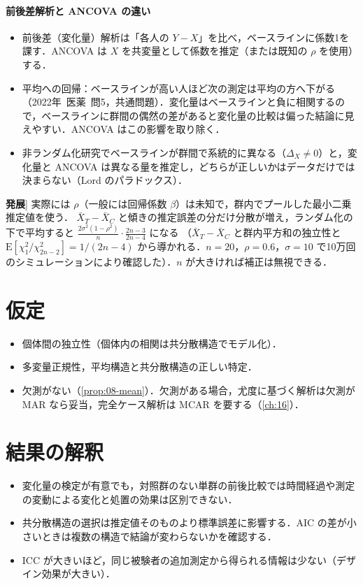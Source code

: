 \documentclass[a4paper,11pt,openany]{ltjsbook}
\newcommand{\tagbox}[2]{\tcbox[on line,boxsep=0.5pt,left=2pt,right=2pt,top=0.5pt,bottom=0.5pt,
  colframe=#1,colback=#1!10,boxrule=0.4pt,arc=1pt]{\scriptsize\bfseries\textcolor{#1}{#2}}}
\newcommand{\Hatten}{\tagbox{bkgray}{発展}}
\newcommand{\kakomon}[2]{\mbox{#1年 医薬 問#2}}
\newcommand{\E}{\mathrm{E}}
\begin{document}
\paragraph{前後差解析と ANCOVA の違い}
\begin{itemize}
\item 前後差（変化量）解析は「各人の $Y-X$」を比べ，ベースラインに係数1を課す．ANCOVA は $X$ を共変量として係数を推定（または既知の $\rho$ を使用）する．
\item 平均への回帰：ベースラインが高い人ほど次の測定は平均の方へ下がる（\kakomon{2022}{5}，共通問題）．変化量はベースラインと負に相関するので，ベースラインに群間の偶然の差があると変化量の比較は偏った結論に見えやすい．ANCOVA はこの影響を取り除く．
\item 非ランダム化研究でベースラインが群間で系統的に異なる（$\Delta_X\ne0$）と，変化量と ANCOVA は異なる量を推定し，どちらが正しいかはデータだけでは決まらない（Lord のパラドックス）．
\end{itemize}

\begin{supbox}[補足：傾きを推定する場合\quad\Hatten]
実際には $\rho$（一般には回帰係数 $\beta$）は未知で，群内でプールした最小二乗推定値を使う．
$\bar X_T-\bar X_C$ と傾きの推定誤差の分だけ分散が増え，ランダム化の下で平均すると $\frac{2\sigma^2(1-\rho^2)}{n}\cdot\frac{2n-3}{2n-4}$ になる
（$\bar X_T-\bar X_C$ と群内平方和の独立性と $\E[\chi^2_1/\chi^2_{2n-2}]=1/(2n-4)$ から導かれる．$n=20$，$\rho=0.6$，$\sigma=10$ で10万回のシミュレーションにより確認した）．$n$ が大きければ補正は無視できる．
\end{supbox}

\section{仮定}\label{sec:08-assump}
\begin{itemize}
\item 個体間の独立性（個体内の相関は共分散構造でモデル化）．
\item 多変量正規性，平均構造と共分散構造の正しい特定．
\item 欠測がない（\cref{prop:08-mean}）．欠測がある場合，尤度に基づく解析は欠測が MAR なら妥当，完全ケース解析は MCAR を要する（\cref{ch:16}）．
\end{itemize}

\section{結果の解釈}\label{sec:08-interp}
\begin{itemize}
\item 変化量の検定が有意でも，対照群のない単群の前後比較では時間経過や測定の変動による変化と処置の効果は区別できない．
\item 共分散構造の選択は推定値そのものより標準誤差に影響する．AIC の差が小さいときは複数の構造で結論が変わらないかを確認する．
\item ICC が大きいほど，同じ被験者の追加測定から得られる情報は少ない（デザイン効果が大きい）．
\end{itemize}
\end{document}
